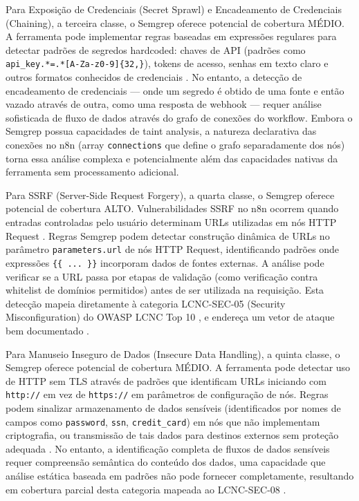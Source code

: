 \documentclass{sftex}
\begin{document}
Para Exposição de Credenciais (Secret Sprawl) e Encadeamento de Credenciais (Chaining), a terceira classe, o Semgrep oferece potencial de cobertura MÉDIO. A ferramenta pode implementar regras baseadas em expressões regulares para detectar padrões de segredos hardcoded: chaves de API (padrões como \texttt{api\_key.*=.*[A-Za-z0-9]\{32,\}}), tokens de acesso, senhas em texto claro e outros formatos conhecidos de credenciais \cite{gitguardian_secret_revocation}. No entanto, a detecção de encadeamento de credenciais — onde um segredo é obtido de uma fonte e então vazado através de outra, como uma resposta de webhook — requer análise sofisticada de fluxo de dados através do grafo de conexões do workflow. Embora o Semgrep possua capacidades de taint analysis, a natureza declarativa das conexões no n8n (array \texttt{connections} que define o grafo separadamente dos nós) torna essa análise complexa e potencialmente além das capacidades nativas da ferramenta sem processamento adicional.

Para SSRF (Server-Side Request Forgery), a quarta classe, o Semgrep oferece potencial de cobertura ALTO. Vulnerabilidades SSRF no n8n ocorrem quando entradas controladas pelo usuário determinam URLs utilizadas em nós HTTP Request \cite{n8n_http_request}. Regras Semgrep podem detectar construção dinâmica de URLs no parâmetro \texttt{parameters.url} de nós HTTP Request, identificando padrões onde expressões \texttt{\{\{ ... \}\}} incorporam dados de fontes externas. A análise pode verificar se a URL passa por etapas de validação (como verificação contra whitelist de domínios permitidos) antes de ser utilizada na requisição. Esta detecção mapeia diretamente à categoria LCNC-SEC-05 (Security Misconfiguration) do OWASP LCNC Top 10 \cite{owasp_lcnc_sec_05}, e endereça um vetor de ataque bem documentado \cite{ssrf_tutorial}.

Para Manuseio Inseguro de Dados (Insecure Data Handling), a quinta classe, o Semgrep oferece potencial de cobertura MÉDIO. A ferramenta pode detectar uso de HTTP sem TLS através de padrões que identificam URLs iniciando com \texttt{http://} em vez de \texttt{https://} em parâmetros de configuração de nós. Regras podem sinalizar armazenamento de dados sensíveis (identificados por nomes de campos como \texttt{password}, \texttt{ssn}, \texttt{credit\_card}) em nós que não implementam criptografia, ou transmissão de tais dados para destinos externos sem proteção adequada \cite{n8n_privacy_what_you_can_do}. No entanto, a identificação completa de fluxos de dados sensíveis requer compreensão semântica do conteúdo dos dados, uma capacidade que análise estática baseada em padrões não pode fornecer completamente, resultando em cobertura parcial desta categoria mapeada ao LCNC-SEC-08 \cite{owasp_lcnc_sec_08}.
\end{document}
